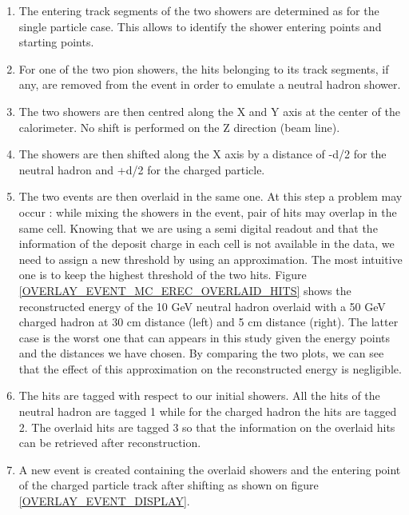 \documentclass[cits]{JINST}
\begin{document}
\begin{enumerate}
  \item The entering track segments of the two showers are determined as for the single particle case. This allows to identify the shower entering points and starting points.
  \item For one of the two pion showers, the hits belonging to its track segments, if any, are removed from the event in order to emulate a neutral hadron shower.
  \item The two showers are then centred along the X and Y axis at the center of the calorimeter. No shift is performed on the Z direction (beam line).
  \item The showers are then shifted along the X axis by a distance of -d/2 for the neutral hadron and +d/2 for the charged particle.
  \item The two events are then overlaid in the same one. At this step a problem may occur : while mixing the showers in the event, pair of hits may overlap in the same cell. Knowing that we are using a semi digital readout and that the information of the deposit charge in each cell is not available in the data, we need to assign a new threshold by using an approximation. The most intuitive one is to keep the highest threshold of the two hits. Figure \ref{OVERLAY_EVENT_MC_EREC_OVERLAID_HITS} shows the reconstructed energy of the 10 GeV neutral hadron overlaid with a 50 GeV charged hadron at 30 cm distance (left) and 5 cm distance (right). The latter case is the worst one that can appears in this study given the energy points and the distances we have chosen. By comparing the two plots, we can see that the effect of this approximation on the reconstructed energy is negligible.
  \item The hits are tagged with respect to our initial showers. All the hits of the neutral hadron are tagged 1 while for the charged hadron the hits are tagged 2. The overlaid hits are tagged 3 so that the information on the overlaid hits can be retrieved after reconstruction.
  \item A new event is created containing the overlaid showers and the entering point of the charged particle track after shifting as shown on figure \ref{OVERLAY_EVENT_DISPLAY}.
\end{enumerate}
\end{document}

